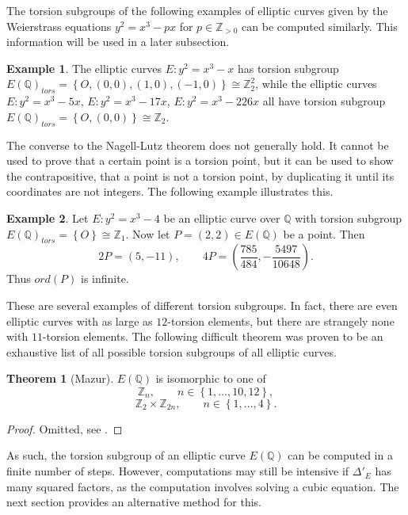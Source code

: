 \documentclass{article}
\newcommand{\Z}{\mathbb{Z}}
\newcommand{\Q}{\mathbb{Q}}
\newcommand{\rb}[1]{\left( #1 \right)}
\newcommand{\cb}[1]{\left\{ #1 \right\}}
\theoremstyle{definition}\newtheorem*{definition}{Definition}
\theoremstyle{definition}\newtheorem*{example}{Example}
\theoremstyle{definition}\newtheorem*{remark}{Remark}
\newtheorem{theorem}[proposition]{Theorem}
\begin{document}
The torsion subgroups of the following examples of elliptic curves given by the Weierstrass equations $ y^2 = x^3 - px $ for $ p \in \Z_{> 0} $ can be computed similarly. This information will be used in a later subsection.

\begin{example}
The elliptic curves $ E : y^2 = x^3 - x $ has torsion subgroup $ E\rb{\Q}_{tors} = \cb{O, \rb{0, 0}, \rb{1, 0}, \rb{-1, 0}} \cong \Z_2^2 $, while the elliptic curves $ E : y^2 = x^3 - 5x $, $ E : y^2 = x^3 - 17x $, $ E : y^2 = x^3 - 226x $ all have torsion subgroup $ E\rb{\Q}_{tors} = \cb{O, \rb{0, 0}} \cong \Z_2 $.
\end{example}

The converse to the Nagell-Lutz theorem does not generally hold. It cannot be used to prove that a certain point is a torsion point, but it can be used to show the contrapositive, that a point is not a torsion point, by duplicating it until its coordinates are not integers. The following example illustrates this.

\begin{example}
Let $ E : y^2 = x^3 - 4 $ be an elliptic curve over $ \Q $ with torsion subgroup $ E\rb{\Q}_{tors} = \cb{O} \cong \Z_1 $. Now let $ P = \rb{2, 2} \in E\rb{\Q} $ be a point. Then
$$ 2P = \rb{5, -11}, \qquad 4P = \rb{\dfrac{785}{484}, -\dfrac{5497}{10648}}. $$
Thus $ ord\rb{P} $ is infinite.
\end{example}

These are several examples of different torsion subgroups. In fact, there are even elliptic curves with as large as $ 12 $-torsion elements, but there are strangely none with $ 11 $-torsion elements. The following difficult theorem was proven to be an exhaustive list of all possible torsion subgroups of all elliptic curves.

\begin{theorem}[Mazur]
$ E\rb{\Q} $ is isomorphic to one of
$$ \Z_n, \qquad n \in \cb{1, \dots, 10, 12}, $$
$$ \Z_2 \times \Z_{2n}, \qquad n \in \cb{1, \dots, 4}. $$
\end{theorem}

\begin{proof}
Omitted, see \cite{mazur}.
\end{proof}

As such, the torsion subgroup of an elliptic curve $ E\rb{\Q} $ can be computed in a finite number of steps. However, computations may still be intensive if $ \Delta'_E $ has many squared factors, as the computation involves solving a cubic equation. The next section provides an alternative method for this.
\end{document}
